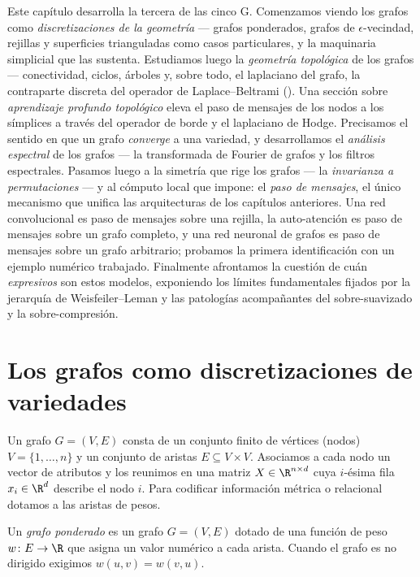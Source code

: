 Este cap\'itulo desarrolla la tercera de las cinco G. Comenzamos viendo los
grafos como \emph{discretizaciones de la geometr\'ia} --- grafos ponderados,
grafos de $\epsilon$-vecindad, rejillas y superficies trianguladas como casos
particulares, y la maquinaria simplicial que las sustenta. Estudiamos luego la
\emph{geometr\'ia topol\'ogica} de los grafos --- conectividad, ciclos,
\'arboles y, sobre todo, el laplaciano del grafo, la contraparte discreta del
operador de Laplace--Beltrami (). Una secci\'on sobre
\emph{aprendizaje profundo topol\'ogico} eleva el paso de mensajes de los nodos
a los s\'implices a trav\'es del operador de borde y el laplaciano de Hodge.
Precisamos el sentido en que un grafo \emph{converge} a una variedad, y
desarrollamos el \emph{an\'alisis espectral} de los grafos --- la transformada de
Fourier de grafos y los filtros espectrales. Pasamos luego a la simetr\'ia que
rige los grafos --- la \emph{invarianza a permutaciones} --- y al c\'omputo local
que impone: el \emph{paso de mensajes}, el \'unico mecanismo que unifica las
arquitecturas de los cap\'itulos anteriores. Una red convolucional es paso de
mensajes sobre una rejilla, la auto-atenci\'on es paso de mensajes sobre un grafo
completo, y una red neuronal de grafos es paso de mensajes sobre un grafo
arbitrario; probamos la primera identificaci\'on con un ejemplo num\'erico
trabajado. Finalmente afrontamos la cuesti\'on de cu\'an \emph{expresivos} son
estos modelos, exponiendo los l\'imites fundamentales fijados por la jerarqu\'ia
de Weisfeiler--Leman y las patolog\'ias acompa\~nantes del sobre-suavizado y la
sobre-compresi\'on.

\section{Los grafos como discretizaciones de variedades}
\label{sec:graphs:discretization}

Un grafo $G = (V, E)$ consta de un conjunto finito de v\'ertices (nodos)
$V = \{1, \dots, n\}$ y un conjunto de aristas $E \subseteq V \times V$. Asociamos
a cada nodo un vector de atributos y los reunimos en una matriz
$X \in \R^{n \times d}$ cuya $i$-\'esima fila $x_i \in \R^d$ describe el nodo $i$.
Para codificar informaci\'on m\'etrica o relacional dotamos a las aristas de
pesos.

\begin{definition}
\label{def:graphs:weighted}
Un \emph{grafo ponderado} es un grafo $G = (V, E)$ dotado de una funci\'on de
peso $w \colon E \to \R$ que asigna un valor num\'erico a cada arista. Cuando el
grafo es no dirigido exigimos $w(u,v) = w(v,u)$.
\end{definition}

